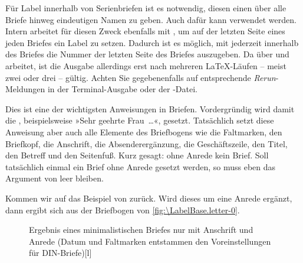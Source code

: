 Für Label innerhalb von Serienbriefen ist es notwendig, diesen einen über alle
Briefe hinweg eindeutigen Namen zu geben. Auch dafür kann 
verwendet werden. Intern arbeitet \KOMAScript{} für diesen Zweck ebenfalls mit
, um auf der letzten Seite eines jeden Briefes ein Label zu
setzen. Dadurch ist es möglich, mit
 jederzeit innerhalb
des Briefes die Nummer der letzten Seite des Briefes auszugeben. Da
 über  und  arbeitet, ist
die Ausgabe allerdings erst nach mehreren \LaTeX-Läufen -- meist zwei oder
drei -- gültig. Achten Sie gegebenenfalls auf entsprechende
\emph{Rerun}-Meldungen in der Terminal-Ausgabe oder der -Datei.%
\EndIndexGroup


\begin{Declaration}
\end{Declaration}
Dies ist eine der wichtigsten Anweisungen in Briefen.  Vordergründig
wird damit die , beispielsweise »Sehr
geehrte Frau~\dots«, gesetzt. Tatsächlich setzt diese
Anweisung aber auch alle Elemente des Briefbogens wie die
Faltmarken, den Briefkopf, die
Anschrift, die Absenderergänzung, die
Geschäftszeile, den Titel,
den Betreff und den
Seitenfuß. Kurz
gesagt: ohne Anrede kein Brief. Soll tatsächlich einmal ein Brief ohne Anrede
gesetzt werden, so muss eben das Argument von  leer bleiben.

\begin{Example}
  Kommen wir auf das Beispiel von
   zurück. Wird dieses
  um eine Anrede ergänzt, dann ergibt sich aus
  der Briefbogen von \autoref{fig:\LabelBase.letter-0}.
  \begin{figure}
    \setcapindent{0pt}%
    \begin{captionbeside}{Ergebnis eines minimalistischen Briefes nur mit
        Anschrift und Anrede (Datum und Faltmarken entstammen den
        Voreinstellungen für DIN-Briefe)}[l]
    \end{captionbeside}
    \label{fig:\LabelBase.letter-0}
  \end{figure}
\end{Example}
\iffalse %
\begin{Explain}
  Bei\textnote{Tipp!} maschinell erstellten Briefen wurde früher meist auf
  eine Anrede verzichtet, da individualisierte Serienbriefe kaum möglich
  waren. Heute sind persönliche Anreden auch bei Massensendungen üblich.%
\end{Explain}%
\else
\ExampleEndFix%
\fi
\EndIndexGroup


